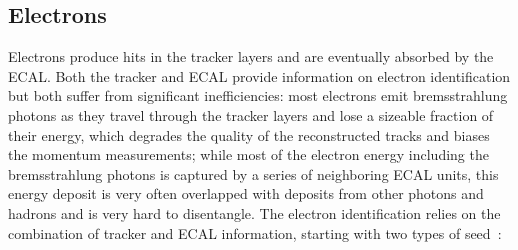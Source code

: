 \subsection{Electrons}\label{sec:reco_ele}

Electrons produce hits in the tracker layers and are eventually absorbed by the ECAL.
Both the tracker and ECAL provide information on electron identification but both suffer from significant inefficiencies:
most electrons emit bremsstrahlung photons as they travel through the tracker layers and lose a sizeable fraction of their energy,
which degrades the quality of the reconstructed tracks and biases the momentum measurements;
while most of the electron energy including the bremsstrahlung photons is captured by a series of neighboring ECAL units,
this energy deposit is very often overlapped with deposits from other photons and hadrons and is very hard to disentangle.
The electron identification relies on the combination of tracker and ECAL information, starting with two types of seed~\cite{cmscollaboration2020electron}:
